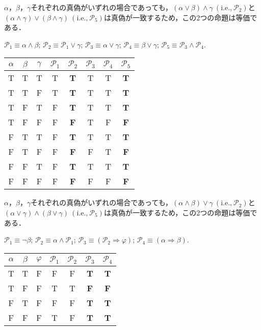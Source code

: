 \documentclass[uplatex,11pt]{jsarticle}
\def\shoumon#1{\vspace{1em}\noindent\ovalbox{\textsf{ #1 }}}
\begin{document}
$\alpha$，$\beta$，$\gamma$それぞれの真偽がいずれの場合であっても，$(\alpha \vee \beta) \wedge \gamma\ (\text{i.e.,}\ \mathscr{P}_2)$と$(\alpha \wedge \gamma) \vee (\beta \wedge \gamma)\ (\text{i.e.,}\ \mathscr{P}_5)$は真偽が一致するため，この2つの命題は等価である．

\newpage
\shoumon{(2) - 分配律2}

$\mathscr{P}_1 \equiv \alpha \wedge \beta$;\quad
$\mathscr{P}_2 \equiv \mathscr{P}_1 \vee \gamma$;\quad
$\mathscr{P}_3 \equiv \alpha \vee \gamma$;\quad
$\mathscr{P}_4 \equiv \beta \vee \gamma$;\quad
$\mathscr{P}_5 \equiv \mathscr{P}_3 \wedge \mathscr{P}_4$.

\begin{center}
	\begin{tabular}{ccc|ccccc} \hline\hline
		$\alpha$ & $\beta$ & $\gamma$ & $\mathscr{P}_1$ & $\mathscr{P}_2$ & $\mathscr{P}_3$ & $\mathscr{P}_4$ & $\mathscr{P}_5$ \\ \hline
		T & T & T & T & \textbf{T} & T & T & \textbf{T} \\
		T & T & F & T & \textbf{T} & T & T & \textbf{T} \\
		T & F & T & F & \textbf{T} & T & T & \textbf{T} \\
		T & F & F & F & \textbf{F} & T & F & \textbf{F} \\
		F & T & T & F & \textbf{T} & T & T & \textbf{T} \\
		F & T & F & F & \textbf{F} & F & T & \textbf{F} \\
		F & F & T & F & \textbf{T} & T & T & \textbf{T} \\
		F & F & F & F & \textbf{F} & F & F & \textbf{F} \\ \hline\hline
	\end{tabular} 
\end{center}

$\alpha$，$\beta$，$\gamma$それぞれの真偽がいずれの場合であっても，$(\alpha \wedge \beta) \vee \gamma\ (\text{i.e.,}\ \mathscr{P}_2)$と$(\alpha \vee \gamma) \wedge (\beta \vee \gamma)\ (\text{i.e.,}\ \mathscr{P}_5)$は真偽が一致するため，この2つの命題は等価である．


\shoumon{(2) - 背理法}

$\mathscr{P}_1 \equiv \neg\beta$;\quad
$\mathscr{P}_2 \equiv \alpha \wedge \mathscr{P}_1$;\quad
$\mathscr{P}_3 \equiv (\mathscr{P}_2 \Longrightarrow \varphi)$;\quad
$\mathscr{P}_4 \equiv (\alpha \Longrightarrow \beta)$.

\begin{center}
	\begin{tabular}{ccc|cccc} \hline\hline
		$\alpha$ & $\beta$ & $\varphi$ & $\mathscr{P}_1$ & $\mathscr{P}_2$ & $\mathscr{P}_3$ & $\mathscr{P}_4$ \\ \hline
		T & T & F & F & F & \textbf{T} & \textbf{T} \\
		T & F & F & T & T & \textbf{F} & \textbf{F} \\
		F & T & F & F & F & \textbf{T} & \textbf{T} \\
		F & F & F & T & F & \textbf{T} & \textbf{T} \\ \hline\hline
	\end{tabular} 
\end{center}
\end{document}
